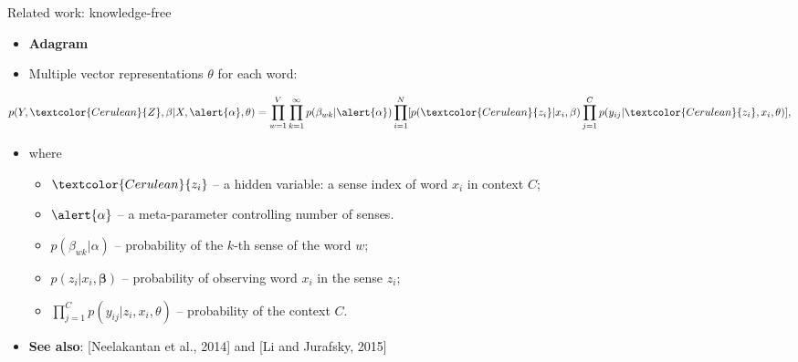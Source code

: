 \begin{frame}{Related work: knowledge-free}

\begin{itemize}
\item \textbf{Adagram}~\cite{bartunov2016breaking}
\item Multiple vector representations $\theta$ for each word:

\pause

\end{itemize}

\vspace{-20pt}

 $$p(Y,\textcolor{Cerulean}{Z},\mathbf{\beta}|X,\alert{\alpha},\theta) = \prod_{w=1}^{V} \prod_{k=1}^{\infty} p(\beta_{wk}|\alert{\alpha}) \prod_{i=1}^N [p(\textcolor{Cerulean}{z_i}|x_i,\mathbf{\beta}) \prod_{j=1}^C p(y_{ij}|\textcolor{Cerulean}{z_i},x_i,\theta)],$$ 
 
\vspace{-10pt}

\begin{itemize}
	
	\item where
\begin{itemize}

\item $\textcolor{Cerulean}{z_i}$ -- a hidden variable: a sense index of word $x_i$ in context $C$; 
\item $\alert{\alpha}$ -- a meta-parameter controlling number of senses.
\item $p(\beta_{wk}|\alpha)$ -- probability of the $k$-th sense of the word $w$;
\item $p(z_i|x_i,\mathbf{\beta})$ -- probability of observing word $x_i$ in the sense $z_i$;
\item $\prod_{j=1}^C p(y_{ij}|z_i,x_i,\theta)$ -- probability of the context $C$.
\end{itemize}

\pause 
\item \alert{\textbf{See also}}: [Neelakantan et al., 2014] and [Li and Jurafsky, 2015]

\end{itemize}
	
\end{frame}


